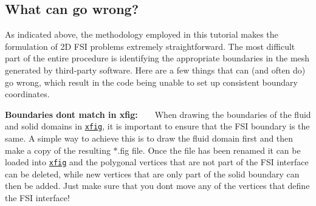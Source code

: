 \hypertarget{index_go_wrong}{}\subsection{What can go wrong?}\label{index_go_wrong}
As indicated above, the methodology employed in this tutorial makes the formulation of 2D F\+SI problems extremely straightforward. The most difficult part of the entire procedure is identifying the appropriate boundaries in the mesh generated by third-\/party software. Here are a few things that can (and often do) go wrong, which result in the code being unable to set up consistent boundary coordinates.
\begin{DoxyItemize}
\item {\bfseries  Boundaries don\textquotesingle{}t match in xfig\+:} ~\newline
~\newline
 When drawing the boundaries of the fluid and solid domains in \href{http://en.wikipedia.org/wiki/Xfig}{\tt xfig}, it is important to ensure that the F\+SI boundary is the same. A simple way to achieve this is to draw the fluid domain first and then make a copy of the resulting $\ast$.fig file. Once the file has been renamed it can be loaded into \href{http://en.wikipedia.org/wiki/Xfig}{\tt xfig} and the polygonal vertices that are not part of the F\+SI interface can be deleted, while new vertices that are only part of the solid boundary can then be added. Just make sure that you don\textquotesingle{}t move any of the vertices that define the F\+SI interface! ~\newline
~\newline


\end{DoxyItemize}

